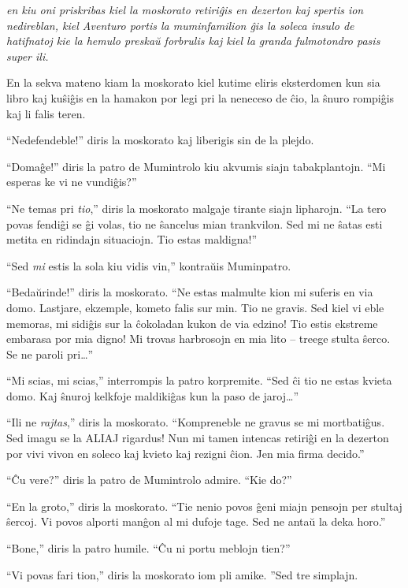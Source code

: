 \noindent\textit{en kiu oni priskribas kiel la moskorato retiriĝis en dezerton kaj spertis ion nedireblan, kiel Aventuro portis la muminfamilion ĝis la soleca insulo de hatifnatoj kie la hemulo preskaŭ forbrulis kaj kiel la granda fulmotondro pasis super ili.}
\hfill \break
\hypertarget{Tria Ĉapitro}{}
\label{Tria Ĉapitro}


\noindent En la sekva mateno kiam la moskorato kiel kutime eliris eksterdomen kun sia libro kaj kuŝiĝis en la hamakon por legi pri la neneceso de ĉio, la ŝnuro rompiĝis kaj li falis teren.

``Nedefendeble!'' diris la moskorato kaj liberigis sin de la plejdo.

``Domaĝe!'' diris la patro de Mumintrolo kiu akvumis siajn tabakplantojn. ``Mi esperas ke vi ne vundiĝis?''

``Ne temas pri \emph{tio},'' diris la moskorato malgaje tirante siajn lipharojn. ``La tero povas fendiĝi se ĝi volas, tio ne ŝancelus mian trankvilon. Sed mi ne ŝatas esti metita en ridindajn situaciojn. Tio estas maldigna!''

``Sed \emph{mi} estis la sola kiu vidis vin,'' kontraŭis Muminpatro.

``Bedaŭrinde!'' diris la moskorato. ``Ne estas malmulte kion mi suferis en via domo. Lastjare, ekzemple, kometo falis sur min. Tio ne gravis. Sed kiel vi eble memoras, mi sidiĝis sur la ĉokoladan kukon de via edzino! Tio estis ekstreme embarasa por mia digno! Mi trovas harbrosojn en mia lito -- treege stulta ŝerco. Se ne paroli pri{\ldots}''

``Mi scias, mi scias,'' interrompis la patro korpremite. ``Sed ĉi tio ne estas kvieta domo. Kaj ŝnuroj kelkfoje maldikiĝas kun la paso de jaroj{\ldots}''

``Ili ne \emph{rajtas},'' diris la moskorato. ``Kompreneble ne gravus se mi mortbatiĝus. Sed imagu se la ALIAJ rigardus! Nun mi tamen intencas retiriĝi en la dezerton por vivi vivon en soleco kaj kvieto kaj rezigni ĉion. Jen mia firma decido.''

``Ĉu vere?'' diris la patro de Mumintrolo admire. ``Kie do?''

``En la groto,'' diris la moskorato. ``Tie nenio povos ĝeni miajn pensojn per stultaj ŝercoj. Vi povos alporti manĝon al mi dufoje tage. Sed ne antaŭ la deka horo.''

``Bone,'' diris la patro humile. ``Ĉu ni portu meblojn tien?''

``Vi povas fari tion,'' diris la moskorato iom pli amike. ''Sed tre simplajn.

